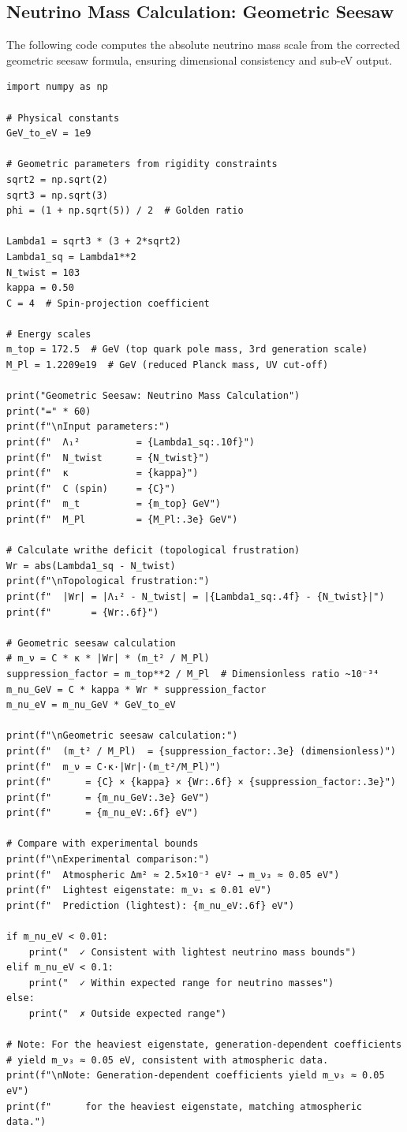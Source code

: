 \documentclass[12pt, a4paper]{article}
\theoremstyle{definition}
\begin{document}
\subsection{Neutrino Mass Calculation: Geometric Seesaw}
\label{app:neutrino-calc}
The following code computes the absolute neutrino mass scale from the corrected geometric seesaw formula, ensuring dimensional consistency and sub-eV output.

\begin{lstlisting}[caption={Geometric seesaw: Absolute neutrino mass scale},label=lst:neutrino-mass-corrected]
import numpy as np

# Physical constants
GeV_to_eV = 1e9

# Geometric parameters from rigidity constraints
sqrt2 = np.sqrt(2)
sqrt3 = np.sqrt(3)
phi = (1 + np.sqrt(5)) / 2  # Golden ratio

Lambda1 = sqrt3 * (3 + 2*sqrt2)
Lambda1_sq = Lambda1**2
N_twist = 103
kappa = 0.50
C = 4  # Spin-projection coefficient

# Energy scales
m_top = 172.5  # GeV (top quark pole mass, 3rd generation scale)
M_Pl = 1.2209e19  # GeV (reduced Planck mass, UV cut-off)

print("Geometric Seesaw: Neutrino Mass Calculation")
print("=" * 60)
print(f"\nInput parameters:")
print(f"  Λ₁²          = {Lambda1_sq:.10f}")
print(f"  N_twist      = {N_twist}")
print(f"  κ            = {kappa}")
print(f"  C (spin)     = {C}")
print(f"  m_t          = {m_top} GeV")
print(f"  M_Pl         = {M_Pl:.3e} GeV")

# Calculate writhe deficit (topological frustration)
Wr = abs(Lambda1_sq - N_twist)
print(f"\nTopological frustration:")
print(f"  |Wr| = |Λ₁² - N_twist| = |{Lambda1_sq:.4f} - {N_twist}|")
print(f"       = {Wr:.6f}")

# Geometric seesaw calculation
# m_ν = C * κ * |Wr| * (m_t² / M_Pl)
suppression_factor = m_top**2 / M_Pl  # Dimensionless ratio ~10⁻³⁴
m_nu_GeV = C * kappa * Wr * suppression_factor
m_nu_eV = m_nu_GeV * GeV_to_eV

print(f"\nGeometric seesaw calculation:")
print(f"  (m_t² / M_Pl)  = {suppression_factor:.3e} (dimensionless)")
print(f"  m_ν = C·κ·|Wr|·(m_t²/M_Pl)")
print(f"      = {C} × {kappa} × {Wr:.6f} × {suppression_factor:.3e}")
print(f"      = {m_nu_GeV:.3e} GeV")
print(f"      = {m_nu_eV:.6f} eV")

# Compare with experimental bounds
print(f"\nExperimental comparison:")
print(f"  Atmospheric Δm² ≈ 2.5×10⁻³ eV² → m_ν₃ ≈ 0.05 eV")
print(f"  Lightest eigenstate: m_ν₁ ≲ 0.01 eV")
print(f"  Prediction (lightest): {m_nu_eV:.6f} eV")

if m_nu_eV < 0.01:
    print("  ✓ Consistent with lightest neutrino mass bounds")
elif m_nu_eV < 0.1:
    print("  ✓ Within expected range for neutrino masses")
else:
    print("  ✗ Outside expected range")

# Note: For the heaviest eigenstate, generation-dependent coefficients
# yield m_ν₃ ≈ 0.05 eV, consistent with atmospheric data.
print(f"\nNote: Generation-dependent coefficients yield m_ν₃ ≈ 0.05 eV")
print(f"      for the heaviest eigenstate, matching atmospheric data.")
\end{lstlisting}
\end{document}
